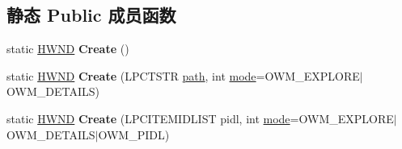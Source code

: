 \subsection*{静态 Public 成员函数}
\begin{DoxyCompactItemize}
\item 
\mbox{\label{struct_s_d_i_main_frame_a14c4fecfd6c67ace70e545537eadf42c}} 
static \hyperlink{interfacevoid}{H\+W\+ND} {\bfseries Create} ()
\item 
\mbox{\label{struct_s_d_i_main_frame_a2e5ecb130edf5b5e2baaa17a9aaf2739}} 
static \hyperlink{interfacevoid}{H\+W\+ND} {\bfseries Create} (L\+P\+C\+T\+S\+TR \hyperlink{structpath}{path}, int \hyperlink{interfacevoid}{mode}=O\+W\+M\+\_\+\+E\+X\+P\+L\+O\+RE$\vert$O\+W\+M\+\_\+\+D\+E\+T\+A\+I\+LS)
\item 
\mbox{\label{struct_s_d_i_main_frame_a45db17ff55fe49d481fe05c626ae6d48}} 
static \hyperlink{interfacevoid}{H\+W\+ND} {\bfseries Create} (L\+P\+C\+I\+T\+E\+M\+I\+D\+L\+I\+ST pidl, int \hyperlink{interfacevoid}{mode}=O\+W\+M\+\_\+\+E\+X\+P\+L\+O\+RE$\vert$O\+W\+M\+\_\+\+D\+E\+T\+A\+I\+LS$\vert$O\+W\+M\+\_\+\+P\+I\+DL)
\end{DoxyCompactItemize}

